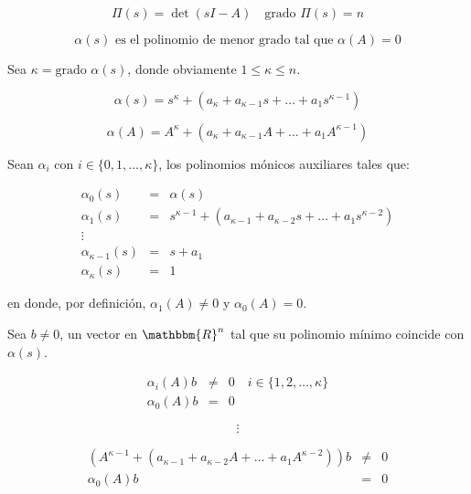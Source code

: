 \documentclass[12pt]{article}
\numberwithin{equation}{subsection}
\begin{document}
\begin{equation}
\Pi(s) = \det{(sI - A)} \quad \text{grado } \Pi(s) = n \nonumber
\end{equation}

\begin{equation}
\alpha(s) \text{ es el polinomio de menor grado tal que } \alpha(A) = 0 \nonumber
\end{equation}

Sea $\kappa = \text{grado } \alpha(s)$, donde obviamente $1 \le \kappa \le n$.

\begin{equation}
\alpha(s) = s^{\kappa} + (a_{\kappa} + a_{\kappa - 1} s + \dots + a_1 s^{\kappa - 1}) \nonumber
\end{equation}

\begin{equation}
\alpha(A) = A^{\kappa} + (a_{\kappa} + a_{\kappa - 1} A + \dots + a_1 A^{\kappa - 1}) \nonumber
\end{equation}

Sean $\alpha_i$ con $i \in \{ 0, 1, \dots, \kappa \}$, los polinomios mónicos auxiliares tales que:

\begin{eqnarray}
\alpha_0(s) & = & \alpha(s) \nonumber \\
\alpha_1(s) & = & s^{\kappa - 1} + (a_{\kappa - 1} + a_{\kappa - 2} s + \dots + a_1 s^{\kappa - 2}) \nonumber \\
\vdots \nonumber \\
\alpha_{\kappa - 1}(s) & = & s + a_1 \nonumber \\
\alpha_{\kappa}(s) & = & 1 \nonumber
\end{eqnarray}

en donde, por definición, $\alpha_1(A) \ne 0$ y $\alpha_0(A) = 0$.

Sea $b \ne 0$, un vector en $\mathbbm{R}^n$ tal que su polinomio mínimo coincide con $\alpha(s)$.

\begin{eqnarray}
\alpha_i(A) b & \ne & 0 \quad i \in \{ 1, 2, \dots, \kappa \} \nonumber \\
\alpha_0(A) b & = & 0 \nonumber
\end{eqnarray}

\begin{equation}
\vdots \nonumber
\end{equation}

\begin{eqnarray}
(A^{\kappa - 1} + (a_{\kappa - 1} + a_{\kappa - 2} A + \dots + a_1 A^{\kappa - 2})) b & \ne & 0 \nonumber \\
\alpha_0(A) b & = & 0 \nonumber
\end{eqnarray}
\end{document}
